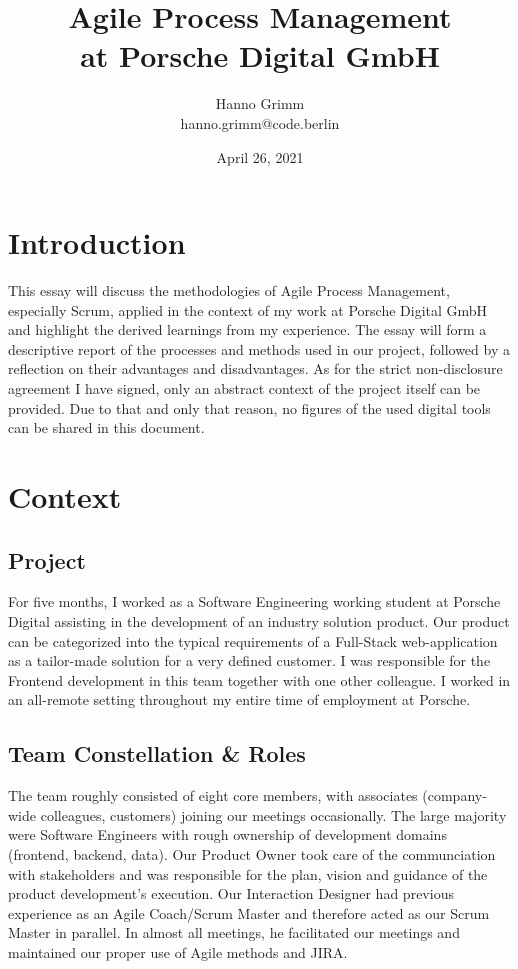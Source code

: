 \documentclass[a4paper]{article}
\title{%
Agile Process Management \\
  \large at Porsche Digital GmbH}
\author{Hanno Grimm\\hanno.grimm@code.berlin}
\date{April 26, 2021}
\begin{document}
\maketitle

\newpage 
\tableofcontents
\newpage 
\section{Introduction}
This essay will discuss the methodologies of Agile Process Management, especially Scrum, applied in the context of my work at Porsche Digital GmbH and highlight the derived learnings from my experience.
The essay will form a descriptive report of the processes and methods used in our project, followed by a reflection on their advantages and disadvantages.
As for the strict non-disclosure agreement I have signed, only an abstract context of the project itself can be provided. Due to that and only that reason, no figures of the used digital tools can be shared in this document.
\section{Context}
\subsection{Project}
For five months, I worked as a Software Engineering working student at Porsche Digital assisting in the development of an industry solution product. 
Our product can be categorized into the typical requirements of a Full-Stack web-application as a tailor-made solution for a very defined customer. 
I was responsible for the Frontend development in this team together with one other colleague. I worked in an all-remote setting throughout my entire time of employment at Porsche.
\subsection{Team Constellation \& Roles}
The team roughly consisted of eight core members, with associates (company-wide colleagues, customers) joining our meetings occasionally. 
The large majority were Software Engineers with rough ownership of development domains (frontend, backend, data). 
Our Product Owner took care of the communciation with stakeholders and was responsible for the plan, vision and guidance of the product development's execution.
Our Interaction Designer had previous experience as an Agile Coach/Scrum Master and therefore acted as our Scrum Master in parallel. 
In almost all meetings, he facilitated our meetings and maintained our proper use of Agile methods and JIRA.
\end{document}
